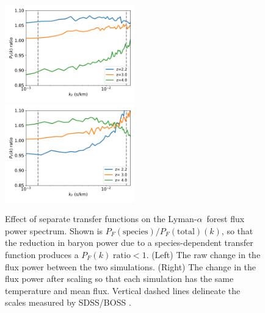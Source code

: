 \documentclass[a4paper,11pt]{article}
\newcommand{\Lya}{Lyman-$\alpha$}
\begin{document}
\begin{figure}
\includegraphics[width=0.5\textwidth]{plots/lya120_relflux_nomf.pdf}
\includegraphics[width=0.5\textwidth]{plots/lya120_relflux_mf_t0.pdf}
\caption{Effect of separate transfer functions on the \Lya~forest flux power spectrum. Shown is $P_F(\mathrm{species})/P_F(\mathrm{total})(k)$, so that the reduction in baryon power due to a species-dependent transfer function produces a $P_F(k)\; \mathrm{ratio} < 1$. (Left) The raw change in the flux power between the two simulations. (Right) The change in the flux power after scaling so that each simulation has the same temperature and mean flux. Vertical dashed lines delineate the scales measured by SDSS/BOSS \protect\cite{PD2013}.
}
\label{fig:lyaflux}
\end{figure}
\end{document}
